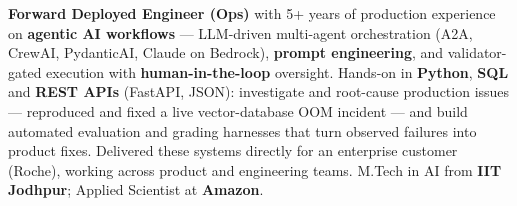 \documentclass[letter,10pt]{article}
\begin{document}

\textbf{Forward Deployed Engineer (Ops)} with 5+ years of production experience on \textbf{agentic AI workflows} — LLM-driven multi-agent orchestration (A2A, CrewAI, PydanticAI, Claude on Bedrock), \textbf{prompt engineering}, and validator-gated execution with \textbf{human-in-the-loop} oversight.
Hands-on in \textbf{Python}, \textbf{SQL} and \textbf{REST APIs} (FastAPI, JSON): investigate and root-cause production issues — reproduced and fixed a live vector-database OOM incident — and build automated evaluation and grading harnesses that turn observed failures into product fixes.
Delivered these systems directly for an enterprise customer (Roche), working across product and engineering teams.
M.Tech in AI from \textbf{IIT Jodhpur}; Applied Scientist at \textbf{Amazon}.
\end{document}
